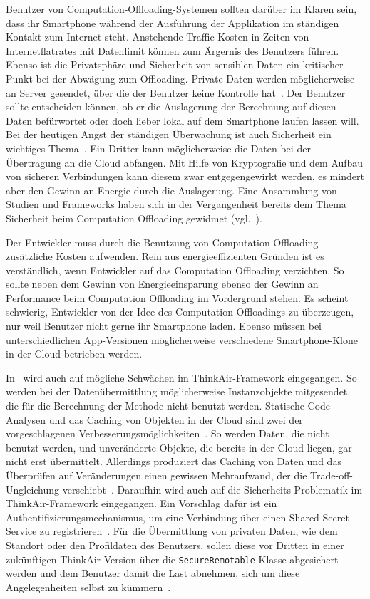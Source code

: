 \documentclass{sigchi}
\begin{document}
Benutzer von Computation-Offloading-Systemen sollten darüber im Klaren sein, dass ihr Smartphone während der Ausführung der Applikation im ständigen Kontakt zum Internet steht.
Anstehende Traffic-Kosten in Zeiten von Internetflatrates mit Datenlimit können zum Ärgernis des Benutzers führen.
Ebenso ist die Privatsphäre und Sicherheit von sensiblen Daten ein kritischer Punkt bei der Abwägung zum Offloading.
Private Daten werden möglicherweise an Server gesendet, über die der Benutzer keine Kontrolle hat~\cite{o4}.
Der Benutzer sollte entscheiden können, ob er die Auslagerung der Berechnung auf diesen Daten befürwortet oder doch lieber lokal auf dem Smartphone laufen lassen will.
Bei der heutigen Angst der ständigen Überwachung ist auch Sicherheit ein wichtiges Thema~\cite{o4}.
Ein Dritter kann möglicherweise die Daten bei der Übertragung an die Cloud abfangen.
Mit Hilfe von Kryptografie und dem Aufbau von sicheren Verbindungen kann diesem zwar entgegengewirkt werden, es mindert aber den Gewinn an Energie durch die Auslagerung.
Eine Ansammlung von Studien und Frameworks haben sich in der Vergangenheit bereits dem Thema Sicherheit beim Computation Offloading gewidmet (vgl.~\cite{o4}).

Der Entwickler muss durch die Benutzung von Computation Offloading zusätzliche Kosten aufwenden.
Rein aus energieeffizienten Gründen ist es verständlich, wenn Entwickler auf das Computation Offloading verzichten.
So sollte neben dem Gewinn von Energieeinsparung ebenso der Gewinn an Performance beim Computation Offloading im Vordergrund stehen.
Es scheint schwierig, Entwickler von der Idee des Computation Offloadings zu überzeugen, nur weil Benutzer nicht gerne ihr Smartphone laden.
Ebenso müssen bei unterschiedlichen App-Versionen möglicherweise verschiedene Smartphone-Klone in der Cloud betrieben werden.

In~\cite{thinkair} wird auch auf mögliche Schwächen im ThinkAir-Framework eingegangen.
So werden bei der Datenübermittlung möglicherweise Instanzobjekte mitgesendet, die für die Berechnung der Methode nicht benutzt werden.
Statische Code-Analysen und das Caching von Objekten in der Cloud sind zwei der vorgeschlagenen Verbesserungsmöglichkeiten~\cite{thinkair}.
So werden Daten, die nicht benutzt werden, und unveränderte Objekte, die bereits in der Cloud liegen, gar nicht erst übermittelt.
Allerdings produziert das Caching von Daten und das Überprüfen auf Veränderungen einen gewissen Mehraufwand, der die Trade-off-Ungleichung verschiebt~\cite{thinkair}.
Daraufhin wird auch auf die Sicherheits-Problematik im ThinkAir-Framework eingegangen.
Ein Vorschlag dafür ist ein Authentifizierungsmechanismus, um eine Verbindung über einen Shared-Secret-Service zu registrieren~\cite{thinkair}.
Für die Übermittlung von privaten Daten, wie dem Standort oder den Profildaten des Benutzers, sollen diese vor Dritten in einer zukünftigen ThinkAir-Version über die \texttt{SecureRemotable}-Klasse abgesichert werden und dem Benutzer damit die Last abnehmen, sich um diese Angelegenheiten selbst zu kümmern~\cite{thinkair}.
\end{document}
